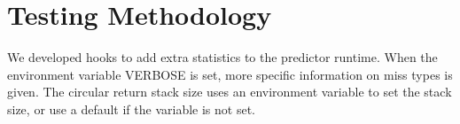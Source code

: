 \section{Testing Methodology}
We developed hooks to add extra statistics to the predictor runtime. When the environment variable VERBOSE is set, more specific information on miss types is given. The circular return stack size uses an environment variable to set the stack size, or use a default if the variable is not set.

